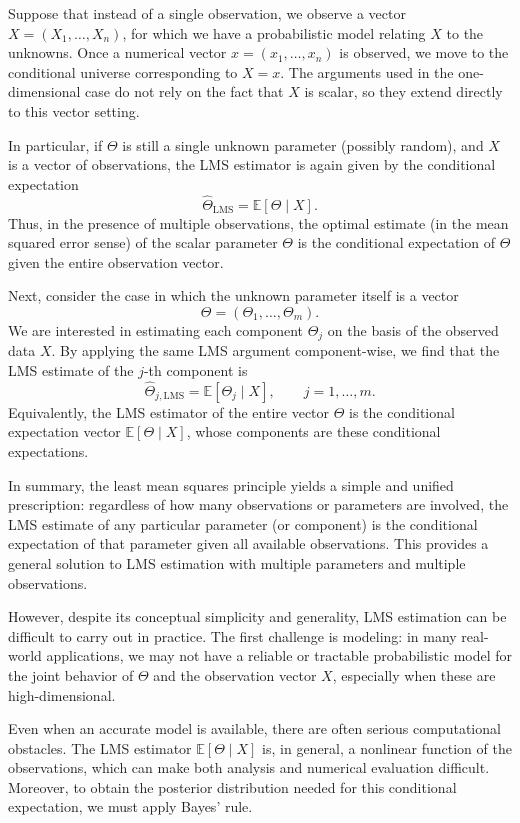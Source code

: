 Suppose that instead of a single observation, we observe a vector \(X = (X_{1},\dots,X_{n})\), for which we have a probabilistic model relating \(X\) to the unknowns.  
Once a numerical vector \(x = (x_{1},\dots,x_{n})\) is observed, we move to the conditional universe corresponding to \(X = x\).  
The arguments used in the one-dimensional case do not rely on the fact that \(X\) is scalar, so they extend directly to this vector setting.

In particular, if \(\Theta\) is still a single unknown parameter (possibly random), and \(X\) is a vector of observations, the LMS estimator is again given by the conditional expectation
\[
\hat{\Theta}_{\text{LMS}}
=
\mathbb{E}[\Theta \mid X].
\]
Thus, in the presence of multiple observations, the optimal estimate (in the mean squared error sense) of the scalar parameter \(\Theta\) is the conditional expectation of \(\Theta\) given the entire observation vector.

Next, consider the case in which the unknown parameter itself is a vector
\[
\Theta
=
(\Theta_{1},\dots,\Theta_{m}).
\]
We are interested in estimating each component \(\Theta_{j}\) on the basis of the observed data \(X\).  
By applying the same LMS argument component-wise, we find that the LMS estimate of the \(j\)-th component is
\[
\hat{\Theta}_{j,\text{LMS}}
=
\mathbb{E}[\Theta_{j} \mid X],
\qquad
j = 1,\dots,m.
\]
Equivalently, the LMS estimator of the entire vector \(\Theta\) is the conditional expectation vector \(\mathbb{E}[\Theta \mid X]\), whose components are these conditional expectations.

In summary, the least mean squares principle yields a simple and unified prescription: regardless of how many observations or parameters are involved, the LMS estimate of any particular parameter (or component) is the conditional expectation of that parameter given all available observations.  
This provides a general solution to LMS estimation with multiple parameters and multiple observations.

However, despite its conceptual simplicity and generality, LMS estimation can be difficult to carry out in practice.  
The first challenge is modeling: in many real-world applications, we may not have a reliable or tractable probabilistic model for the joint behavior of \(\Theta\) and the observation vector \(X\), especially when these are high-dimensional.

Even when an accurate model is available, there are often serious computational obstacles.  
The LMS estimator \(\mathbb{E}[\Theta \mid X]\) is, in general, a nonlinear function of the observations, which can make both analysis and numerical evaluation difficult.  
Moreover, to obtain the posterior distribution needed for this conditional expectation, we must apply Bayes' rule.

